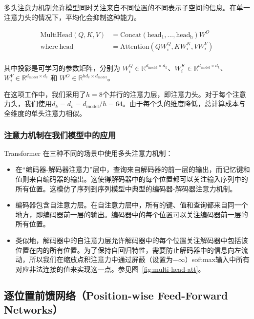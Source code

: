 \documentclass[lang=cn,a4paper,newtx]{elegantpaper}
\newcommand{\dmodel}{d_{\text{model}}}
\begin{document}
多头注意力机制允许模型同时关注来自不同位置的不同表示子空间的信息。在单一注意力头的情况下，平均化会抑制这种能力。

\begin{align*}
  \mathrm{MultiHead}(Q, K, V) &= \mathrm{Concat}(\mathrm{head_1}, ..., \mathrm{head_h})W^O\\
  \text{where}~\mathrm{head_i} &= \mathrm{Attention}(QW^Q_i, KW^K_i, VW^V_i)\\
\end{align*}

其中投影是可学习的参数矩阵，分别为 $W^Q_i \in \mathbb{R}^{\dmodel \times d_k}$、$W^K_i \in \mathbb{R}^{\dmodel \times d_k}$、$W^V_i \in \mathbb{R}^{\dmodel \times d_v}$ 和 $W^O \in \mathbb{R}^{hd_v \times \dmodel}$。

在这项工作中，我们采用了$h=8$个并行的注意力层，即注意力头。对于每个注意力头，我们使用$d_k=d_v=\dmodel/h=64$。由于每个头的维度降低，总计算成本与全维度的单头注意力相似。

\subsubsection{注意力机制在我们模型中的应用}

Transformer 在三种不同的场景中使用多头注意力机制：

\begin{itemize}
 \item 在“编码器-解码器注意力”层中，查询来自解码器的前一层的输出，而记忆键和值则来自编码器的输出。这使得解码器中的每个位置都可以关注输入序列中的所有位置。这模仿了序列到序列模型中典型的编码器-解码器注意力机制。

 \item 编码器包含自注意力层。在自注意力层中，所有的键、值和查询都来自同一个地方，即编码器前一层的输出。编码器中的每个位置可以关注编码器前一层的所有位置。

 \item 类似地，解码器中的自注意力层允许解码器中的每个位置关注解码器中包括该位置在内的所有位置。为了保持自回归特性，需要防止解码器中的信息向左流动，所以我们在缩放点积注意力中通过屏蔽（设置为$-\infty$）softmax输入中所有对应非法连接的值来实现这一点。参见图~\ref{fig:multi-head-att}。

\end{itemize}

\subsection{逐位置前馈网络（Position-wise Feed-Forward Networks）}\label{sec:ffn}
\end{document}
